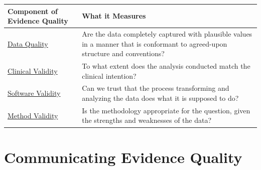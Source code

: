 \documentclass[11pt]{book}
\theoremstyle{definition}
\theoremstyle{definition}
\theoremstyle{definition}
\theoremstyle{remark}
\begin{document}
\begin{longtable}[]{@{}ll@{}}
\toprule
\begin{minipage}[b]{0.19\columnwidth}\raggedright
Component of Evidence Quality\strut
\end{minipage} & \begin{minipage}[b]{0.75\columnwidth}\raggedright
What it Measures\strut
\end{minipage}\tabularnewline
\midrule
\endhead
\begin{minipage}[t]{0.19\columnwidth}\raggedright
\href{DataQuality.html}{Data Quality}\strut
\end{minipage} & \begin{minipage}[t]{0.75\columnwidth}\raggedright
Are the data completely captured with plausible values in a manner that is conformant to agreed-upon structure and conventions?\strut
\end{minipage}\tabularnewline
\begin{minipage}[t]{0.19\columnwidth}\raggedright
\href{ClinicalValidity.html}{Clinical Validity}\strut
\end{minipage} & \begin{minipage}[t]{0.75\columnwidth}\raggedright
To what extent does the analysis conducted match the clinical intention?\strut
\end{minipage}\tabularnewline
\begin{minipage}[t]{0.19\columnwidth}\raggedright
\href{SoftwareValidity.html}{Software Validity}\strut
\end{minipage} & \begin{minipage}[t]{0.75\columnwidth}\raggedright
Can we trust that the process transforming and analyzing the data does what it is supposed to do?\strut
\end{minipage}\tabularnewline
\begin{minipage}[t]{0.19\columnwidth}\raggedright
\href{MethodValidity.html}{Method Validity}\strut
\end{minipage} & \begin{minipage}[t]{0.75\columnwidth}\raggedright
Is the methodology appropriate for the question, given the strengths and weaknesses of the data?\strut
\end{minipage}\tabularnewline
\bottomrule
\end{longtable}

\hypertarget{communicating-evidence-quality}{%
\section{Communicating Evidence Quality}\label{communicating-evidence-quality}}
\end{document}
